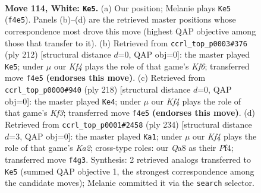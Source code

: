 \documentclass[11pt]{article}
\begin{document}
\clearpage

\begin{figure}[p]\centering
\begin{subfigure}{0.46\textwidth}\centering
\resizebox{\linewidth}{!}{%
\newchessgame
\chessboard[
  setfen={Q7/7k/8/8/5K2/8/8/8 w - - 7 114},
  showmover=false,
  pgfstyle=straightmove, color=movearrow, markmove={f4-e5}
]}
\caption{}
\end{subfigure}\hfill
\begin{subfigure}{0.46\textwidth}\centering
\resizebox{\linewidth}{!}{%
\newchessgame
\chessboard[
  setfen={8/8/5K2/8/8/8/3Q4/6k1 w - - 2 107},
  showmover=false,
  pgfstyle=straightmove, color=movearrow, markmove={f6-e5}
]}
\caption{}
\end{subfigure}
\\[4pt]
\begin{subfigure}{0.46\textwidth}\centering
\resizebox{\linewidth}{!}{%
\newchessgame
\chessboard[
  setfen={k7/8/8/1Q6/8/5K2/8/8 w - - 5 110},
  showmover=false,
  pgfstyle=straightmove, color=movearrow, markmove={f3-e4}
]}
\caption{}
\end{subfigure}\hfill
\begin{subfigure}{0.46\textwidth}\centering
\resizebox{\linewidth}{!}{%
\newchessgame
\chessboard[
  setfen={8/8/8/8/1k3P2/8/K7/8 w - - 6 118},
  showmover=false,
  pgfstyle=straightmove, color=movearrow, markmove={a2-a1}
]}
\caption{}
\end{subfigure}
\caption{\textbf{Move 114, White: \texttt{Ke5}.} (a) Our position; Melanie plays \texttt{Ke5} (\texttt{f4e5}). Panels (b)--(d) are the retrieved master positions whose correspondence most drove this move (highest QAP objective among those that transfer to it). (b) Retrieved from \texttt{ccrl\_top\_p0003\#376} (ply 212) [structural distance $d$=0, QAP obj=0]: the master played \texttt{Ke5}; under $\mu$ our \emph{Kf4} plays the role of that game's \emph{Kf6}; transferred move \texttt{f4e5} \textbf{(endorses this move)}. (c) Retrieved from \texttt{ccrl\_top\_p0000\#940} (ply 218) [structural distance $d$=0, QAP obj=0]: the master played \texttt{Ke4}; under $\mu$ our \emph{Kf4} plays the role of that game's \emph{Kf3}; transferred move \texttt{f4e5} \textbf{(endorses this move)}. (d) Retrieved from \texttt{ccrl\_top\_p0001\#2458} (ply 234) [structural distance $d$=3, QAP obj=0]: the master played \texttt{Ka1}; under $\mu$ our \emph{Kf4} plays the role of that game's \emph{Ka2}; cross-type roles: our \emph{Q}a8 as their \emph{P}f4; transferred move \texttt{f4g3}. Synthesis: 2 retrieved analogs transferred to \texttt{Ke5} (summed QAP objective 1, the strongest correspondence among the candidate moves); Melanie committed it via the \texttt{search} selector.}
\label{fig:thought-m226}
\end{figure}
\end{document}
